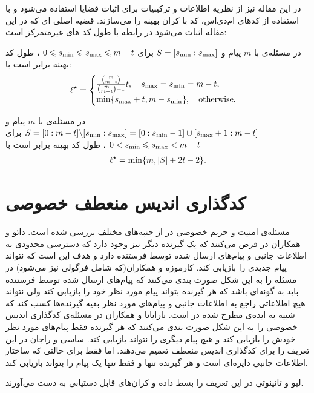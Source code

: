 در این مقاله نیز از نظریه اطلاعات و ترکیبیات برای اثبات قضایا استفاده می‌شود و با استفاده از کدهای ام‌دی‌اس، کد با کران بهینه را می‌سازند. قضیه اصلی ای که در این مقاله اثبات می‌شود در رابطه با طول کد های غیرمتمرکز است:
\begin{theorem}[consecutive]
	\label{thm:consecutive_s}
	در مسئله‌ی
	با
	$m$ 
	پیام و
	  $S=[s_{\rm min}:s_{\rm max}]$
	  برای
	  $0\leqslant s_{\rm min} \leqslant s_{\rm max} \leqslant m-t$
	  ، طول کد بهینه برابر است با:
	\begin{align}
		\ell^{\star}=\begin{cases}
			\frac{\binom{m}{m-t}}{\binom{m}{m-t}-1}  t, \quad s_{\rm max}=s_{\rm min}=m-t,\\
			\min\{s_{\rm max}+t, m-s_{\rm min}\}, \quad \text{otherwise.}
		\end{cases}
		\label{eq:thm:consecutive_s}
	\end{align}
\end{theorem}


\begin{theorem}[complement-consecutive]
	\label{thm:complement_consecutive_s}
	در مسئله‌ی
با
 $m$ 
 پیام
 و
 $S=[0:m-t]\backslash [s_{\rm min}:s_{\rm max}] = [0:s_{\rm min}-1]\cup[s_{\rm max}+1:m-t]$
 برای
 $0 < s_{\rm min} \leqslant s_{\rm max} < m-t$
 ، طول کد بهینه برابر است با
	\begin{align}
		\ell^{\star}=\min\{m,|S|+2t-2\}.
		\label{eq:thm:complement_consecutive_s}
	\end{align}
\end{theorem}

\section{کدگذاری اندیس منعطف خصوصی}
\label{sec:privatepliable}
مسئله‌ی امنیت و حریم خصوصی در 
\icod
 از جنبه‌های مختلف بررسی شده است. دائو و همکاران در
\cite{6166891}
فرض می‌کنند که یک گیرنده دیگر نیز وجود دارد که دسترسی محدودی به اطلاعات جانبی و پیام‌های ارسال شده توسط فرستنده دارد و هدف این است که نتواند پیام جدیدی را بازیابی کند. کارموزه و همکاران(که شامل فرگولی نیز می‌‌شود) در
\cite{8006988}
مسئله را به این شکل صورت بندی می‌کنند که پیام‌های ارسال شده توسط فرستنده باید به گونه‌ای باشد که هر گیرنده بتواند پیام مورد نظر خود را بازیابی کند ولی نتواند هیچ اطلاعاتی راجع به اطلاعات جانبی و پیام‌های مورد نظر بقیه گیرنده‌ها کسب کند که شبیه به ایده‌ی
	مطرح شده در
\cite{7889028}
است.
نارایانا و همکاران در
\cite{9627083}
مسئله‌ی کدگذاری اندیس خصوصی را به این شکل صورت بندی می‌کنند که هر گیرنده فقط پیام‌های مورد نظر خودش را بازیابی کند و هیچ پیام دیگری را نتواند بازیابی کند. ساسی و راجان در
\cite{sasi2019pliable}
این تعریف را برای کدگذاری اندیس منعطف تعمیم می‌دهند. اما فقط برای حالتی که ساختار اطلاعات جانبی دایره‌ای است و هر گیرنده تنها و فقط تنها یک پیام را بتواند بازیابی کند.

لیو و تانینوتی در 
\cite{8989161}
این تعریف را بسط داده و کران‌های قابل دستیابی به دست می‌آورند.